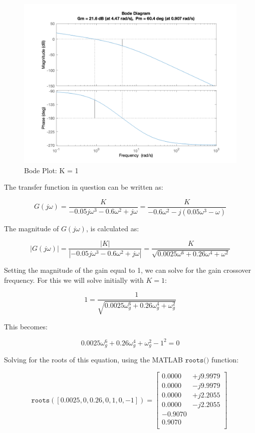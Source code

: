\documentclass[12pt, letterpaper]{../assignment}
\begin{document}
\begin{figure}[H]
    \centering
    \includegraphics[width=1\linewidth]{./figures/BodePlot_K_1.png}
    \caption{Bode Plot: K = 1}
 \end{figure}

The transfer function in question can be written as:

$$ G(j\omega) = \frac{K}{- 0.05 j \omega ^3 - 0.6 \omega ^2 + j \omega }
              = \frac{K}{- 0.6 \omega ^2 - j(0.05\omega ^3 - \omega) }$$

The magnitude of $G(j\omega)$, is calculated as:

$$ |G(j\omega)| = \frac{|K|}{|- 0.05 j \omega ^3 - 0.6 \omega ^2 + j \omega |}
                = \frac{K}{\sqrt{0.0025 \omega^6 + 0.26 \omega^4 + \omega^2 }}$$

Setting the magnitude of the gain equal to 1, we can solve for the gain crossover frequency.
For this we will solve initially with $K=1$:

$$ 1 = \frac{1}{\sqrt{0.0025 \omega_g^6 + 0.26 \omega_g^4 + \omega_g^2 }}$$

This becomes:

$$ 0.0025 \omega_g^6 + 0.26 \omega_g^4 + \omega_g^2 - 1^2  = 0 $$

Solving for the roots of this equation, using the MATLAB $\texttt{roots()}$ function:


$$ \texttt{roots}([0.0025,0,0.26,0,1,0,-1]) = \left[\begin{array}{rr} 
    0.0000 &+ j9.9979\\
    0.0000 &- j9.9979\\
    0.0000 &+ j2.2055\\
    0.0000 &- j2.2055\\
   -0.9070 & \\
   \mathbf{ 0.9070} & \\
    \end{array} \right]\ $$
\end{document}

